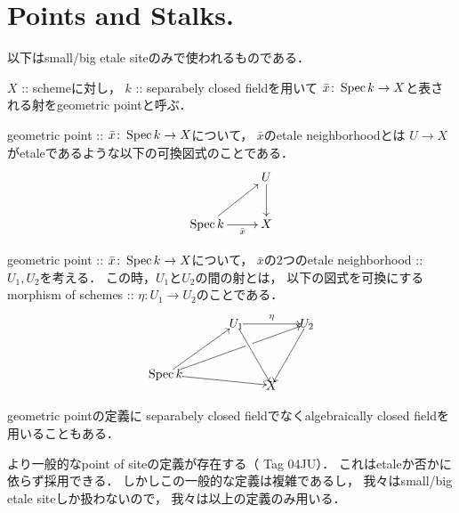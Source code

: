 \section{Points and Stalks.}
以下はsmall/big etale siteのみで使われるものである．
\begin{Def}
\begin{myenum}
    \item 
    $X$ :: schemeに対し，
    $k$ :: separabely closed fieldを用いて
    $\bar{x} \colon \operatorname{Spec} k \to X$と表される射をgeometric pointと呼ぶ．

    \item
    geometric point :: $\bar{x} \colon \operatorname{Spec} k \to X$について，
    $\bar{x}$のetale neighborhoodとは
    $U \to X$がetaleであるような以下の可換図式のことである．
    \[\xymatrix{
        {} & U \ar[d]\\
        \Spec k \ar[r]_-{\bar{x}} \ar[ru]& X
    }\]

    \item
    geometric point :: $\bar{x} \colon \operatorname{Spec} k \to X$について，
    $\bar{x}$の$2$つのetale neighborhood :: $U_1, U_2$を考える．
    この時，$U_1$と$U_2$の間の射とは，
    以下の図式を可換にするmorphism of schemes :: $\eta \colon U_1 \to U_2$のことである．
    \begin{equation*}
    \begin{xy}
        (0,17.32) *{U_1}="U1", (20, 17.32) *{U_2}="U2",
        (-20, 3) *{\Spec k}="k", (10,0) *{X}="X",
        \ar "U1";"X" \ar "U2";"X" \ar "U1";"U2"^{\eta}
        \ar "k";"U1" \ar|(.59)\hole "k";"U2" \ar "k";"X"
    \end{xy}
    \end{equation*}
\end{myenum}
\end{Def}

\begin{Remark}
    geometric pointの定義に
    separabely closed fieldでなくalgebraically closed fieldを用いることもある．
\end{Remark}

\begin{Remark}
    より一般的なpoint of siteの定義が存在する（\cite{SP} Tag 04JU）．
    これはetaleか否かに依らず採用できる．
    しかしこの一般的な定義は複雑であるし，
    我々はsmall/big etale siteしか扱わないので，
    我々は以上の定義のみ用いる．
\end{Remark}

